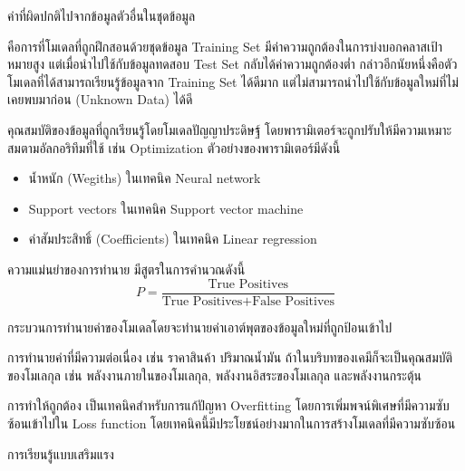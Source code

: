 \begin{description}[style=nextline]
    \item[Outlier] ค่าที่ผิดปกติไปจากข้อมูลตัวอื่นในชุดข้อมูล

    \item[Overfitting] คือการที่โมเดลที่ถูกฝึกสอนด้วยชุดข้อมูล Training Set มีค่าความถูกต้องในการบ่งบอกคลาสเป้าหมายสูง 
    แต่เมื่อนำไปใช้กับข้อมูลทดสอบ Test Set กลับได้ค่าความถูกต้องต่ำ กล่าวอีกนัยหนึ่งคือตัวโมเดลที่ได้สามารถเรียนรู้ข้อมูลจาก Training Set 
    ได้ดีมาก แต่ไม่สามารถนำไปใช้กับข้อมูลใหม่ที่ไม่เคยพบมาก่อน (Unknown Data) ได้ดี

    \item[Parameter] คุณสมบัติของข้อมูลที่ถูกเรียนรู้โดยโมเดลปัญญาประดิษฐ์ โดยพารามิเตอร์จะถูกปรับให้มีความเหมาะสมตามอัลกอริทึมที่ใช้
    เช่น Optimization ตัวอย่างของพารามิเตอร์มีดังนี้
    \begin{itemize}
        \item น้ำหนัก (Wegiths) ในเทคนิค Neural network
        \item Support vectors ในเทคนิค Support vector machine
        \item ค่าสัมประสิทธิ์ (Coefficients) ในเทคนิค Linear regression
    \end{itemize}

    \item[Precision] ความแม่นยำของการทำนาย มีสูตรในการคำนวณดังนี้
    \begin{equation}\label{eq:precision}
        P = \frac{\text{True Positives}}{\text{True Positives} + \text{False Positives}}
    \end{equation}

    \item[Prediction] กระบวนการทำนายค่าของโมเดลโดยจะทำนายค่าเอาต์พุตของข้อมูลใหม่ที่ถูกป้อนเข้าไป

    \item[Regression]  การทำนายค่าที่มีความต่อเนื่อง เช่น ราคาสินค้า ปริมาณน้ำมัน ถ้าในบริบทของเคมีก็จะเป็นคุณสมบัติของโมเลกุล 
    เช่น พลังงานภายในของโมเลกุล, พลังงานอิสระของโมเลกุล และพลังงานกระตุ้น

    \item[Regularization] การทำให้ถูกต้อง เป็นเทคนิคสำหรับการแก้ปัญหา Overfitting โดยการเพิ่มพจน์พิเศษที่มีความซับซ้อนเข้าไปใน 
    Loss function โดยเทคนิคนี้มีประโยชน์อย่างมากในการสร้างโมเดลที่มีความซับซ้อน

    \item[Reinforment learning] การเรียนรู้แบบเสริมแรง 


\end{description}
